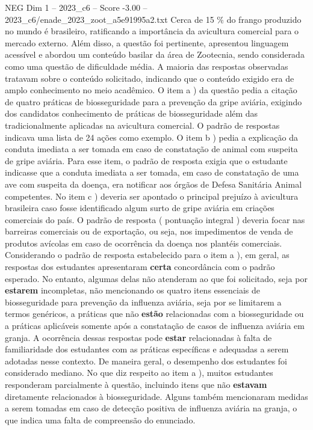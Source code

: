 \begin{textsample}{NEG Dim 1 – 2023\_c6 – Score -3.00 – 2023\_c6/enade\_2023\_zoot\_a5e91995a2.txt}
Cerca de 15 \% do frango produzido no mundo é brasileiro, ratificando a importância da avicultura comercial para o mercado externo.
Além disso, a questão foi pertinente, apresentou linguagem acessível e abordou um conteúdo basilar da área de Zootecnia, sendo considerada como uma questão de dificuldade média.
A maioria das respostas observadas tratavam sobre o conteúdo solicitado, indicando que o conteúdo exigido era de amplo conhecimento no meio acadêmico.
O item a ) da questão pedia a citação de quatro práticas de biosseguridade para a prevenção da gripe aviária, exigindo dos candidatos conhecimento de práticas de biosseguridade além das tradicionalmente aplicadas na avicultura comercial.
O padrão de respostas indicava uma lista de 24 ações como exemplo.
O item b ) pedia a explicação da conduta imediata a ser tomada em caso de constatação de animal com suspeita de gripe aviária.
Para esse item, o padrão de resposta exigia que o estudante indicasse que a conduta imediata a ser tomada, em caso de constatação de uma ave com suspeita da doença, era notificar aos órgãos de Defesa Sanitária Animal competentes.
No item c ) deveria ser apontado o principal prejuízo à avicultura brasileira caso fosse identificado algum surto de gripe aviária em criações comerciais do país.
O padrão de resposta ( pontuação integral ) deveria focar nas barreiras comerciais ou de exportação, ou seja, nos impedimentos de venda de produtos avícolas em caso de ocorrência da doença nos plantéis comerciais.
Considerando o padrão de resposta estabelecido para o item a ), em geral, as respostas dos estudantes apresentaram \textbf{certa} concordância com o padrão esperado.
No entanto, algumas delas não atenderam ao que foi solicitado, seja por \textbf{estarem} incompletas, não mencionando os quatro itens essenciais de biosseguridade para prevenção da influenza aviária, seja por se limitarem a termos genéricos, a práticas que não \textbf{estão} relacionadas com a biosseguridade ou a práticas aplicáveis somente após a constatação de casos de influenza aviária em granja.
A ocorrência dessas respostas pode \textbf{estar} relacionadas à falta de familiaridade dos estudantes com as práticas específicas e adequadas a serem adotadas nesse contexto.
De maneira geral, o desempenho dos estudantes foi considerado mediano.
No que diz respeito ao item a ), muitos estudantes responderam parcialmente à questão, incluindo itens que não \textbf{estavam} diretamente relacionados à biosseguridade.
Alguns também mencionaram medidas a serem tomadas em caso de detecção positiva de influenza aviária na granja, o que indica uma falta de compreensão do enunciado.

\end{textsample}
